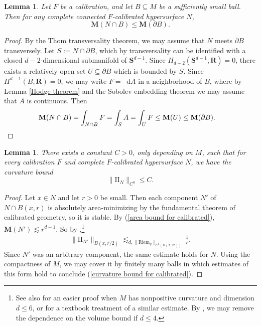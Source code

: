 \documentclass[reqno,11pt]{amsart}
\newcommand{\RR}{\mathbf{R}}
\newcommand{\Sph}{\mathbf S}
\newcommand*\dif{\mathop{}\!\mathrm{d}}
\newcommand{\Two}{\mathrm{I\!I}}
\newcommand{\Riem}{\mathrm{Riem}}
\newcommand{\Mass}{\mathbf M}
\newtheorem{lemma}[theorem]{Lemma}
\theoremstyle{definition}
\numberwithin{equation}{section}
\begin{document}
\begin{lemma}
Let $F$ be a calibration, and let $B \subseteq M$ be a sufficiently small ball.
Then for any complete connected $F$-calibrated hypersurface $N$, 
\begin{equation}\label{area bound for calibrated}
\Mass(N \cap B) \leq \Mass(\partial B).
\end{equation}
\end{lemma}
\begin{proof}
By the Thom transversality theorem, we may assume that $N$ meets $\partial B$ transversely. 
Let $S := N \cap \partial B$, which by transversality can be identified with a closed $d - 2$-dimensional submanifold of $\Sph^{d - 1}$.
Since $H_{d - 2}(\Sph^{d - 1}, \RR) = 0$, there exists a relatively open set $U \subseteq \partial B$ which is bounded by $S$.
Since $H^{d - 1}(B, \RR) = 0$, we may write $F = \dif A$ in a neighborhood of $B$, where by Lemma \ref{Hodge theorem} and the Sobolev embedding theorem we may assume that $A$ is continuous. Then
\begin{align*}
\Mass(N \cap B) &= \int_{N \cap B} F = \int_S A = \int_U F \leq \Mass(U) \leq \Mass(\partial B). \qedhere
\end{align*}
\end{proof}

\begin{lemma}
There exists a constant $C > 0$, only depending on $M$, such that for every calibration $F$ and complete $F$-calibrated hypersurface $N$, we have the curvature bound
\begin{equation}\label{curvature bound for calibrated}
\|\Two_N\|_{C^0} \leq C.
\end{equation}
\end{lemma}
\begin{proof}
Let $x \in N$ and let $r > 0$ be small.
Then each component $N'$ of $N \cap B(x, r)$ is absolutely area-minimizing by the fundamental theorem of calibrated geometry, so it is stable.
By (\ref{area bound for calibrated}), $\Mass(N') \lesssim r^{d - 1}$.
So by \cite[pg785, Corollary 1]{Schoen81},\footnote{See also \cite[Theorem 3]{Schoen75} for an easier proof when $M$ has nonpositive curvature and dimension $d \leq 6$, or \cite[Chapter 2, \S\S4-5]{colding2011course} for a textbook treatment of a similar estimate. By \cite[Lemma 2.4]{chodosh2022complete}, we may remove the dependence on the volume bound if $d \leq 4$.}
\begin{align*}
\|\Two_{N'}\|_{B(x, r/2)} \lesssim_{d, \|\Riem_g\|_{C^0(B(x, 2r))}} \frac{1}{r}.
\end{align*}
Since $N'$ was an arbitrary component, the same estimate holds for $N$.
Using the compactness of $M$, we may cover it by finitely many balls in which estimates of this form hold to conclude (\ref{curvature bound for calibrated}).
\end{proof}
\end{document}
